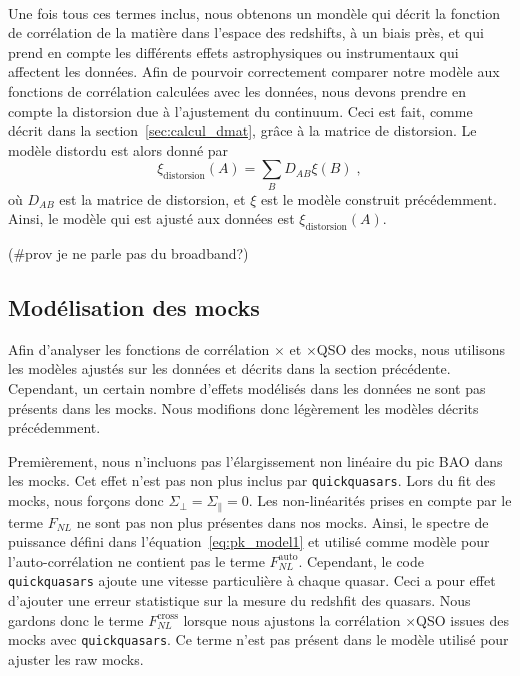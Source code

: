 \documentclass[11pt, twoside, a4paper, openright]{report}
\begin{document}
\paragraph{}
Une fois tous ces termes inclus, nous obtenons un mondèle qui décrit la fonction de corrélation de la matière dans l'espace des redshifts, à un biais près, et qui prend en compte les différents effets astrophysiques ou instrumentaux qui affectent les données.
Afin de pourvoir correctement comparer notre modèle aux fonctions de corrélation calculées avec les données, nous devons prendre en compte la distorsion due à l'ajustement du continuum. Ceci est fait, comme décrit dans la section~\ref{sec:calcul_dmat}, grâce à la matrice de distorsion. Le modèle distordu est alors donné par
\begin{equation}
  \label{eq:model_dist}
  \xi_{\mathrm{distorsion}}(A) = \sum_{B}D_{AB}\xi(B) \; ,
\end{equation}
où $D_{AB}$ est la matrice de distorsion, et $\xi$ est le modèle construit précédemment.
Ainsi, le modèle qui est ajusté aux données est $\xi_{\mathrm{distorsion}}(A)$.

(\#prov je ne parle pas du broadband?)




\subsection{Modélisation des mocks}
Afin d'analyser les fonctions de corrélation \lya{}$\times$\lya{} et \lya{}$\times$QSO des mocks, nous utilisons les modèles ajustés sur les données et décrits dans la section précédente. Cependant, un certain nombre d'effets modélisés dans les données ne sont pas présents dans les mocks. Nous modifions donc légèrement les modèles décrits précédemment.

Premièrement, nous n'incluons pas l'élargissement non linéaire du pic BAO dans les mocks. Cet effet n'est pas non plus inclus par \texttt{quickquasars}. Lors du fit des mocks, nous forçons donc $\Sigma_{\perp} = \Sigma_{\parallel} = 0$.
Les non-linéarités prises en compte par le terme $F_{NL}$ ne sont pas non plus présentes dans nos mocks. Ainsi, le spectre de puissance défini dans l'équation~\ref{eq:pk_model1} et utilisé comme modèle pour l'auto-corrélation ne contient pas le terme $F_{NL}^{\mathrm{auto}}$. Cependant, le code \texttt{quickquasars} ajoute une vitesse particulière à chaque quasar. Ceci a pour effet d'ajouter une erreur statistique sur la mesure du redshfit des quasars. Nous gardons donc le terme $F_{NL}^{\mathrm{cross}}$ lorsque nous ajustons la corrélation \lya{}$\times$QSO issues des mocks avec \texttt{quickquasars}. Ce terme n'est pas présent dans le modèle utilisé pour ajuster les raw mocks.
\end{document}
